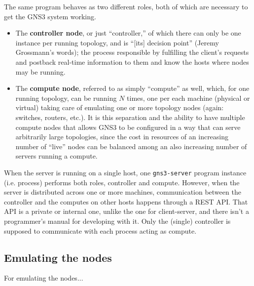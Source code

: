 The same program behaves as two different roles, both of which are necessary to get the GNS3 system working.

\begin{itemize}
	\item The \textbf{controller node}, or just ``controller,'' of which there can only be one instance per running topology, and is ``[its] decision point'' (Jeremy Grossmann's words); the process responsible by fulfilling the client's requests and postback real-time information to them and know the hosts where nodes may be running.
	\item The \textbf{compute node}, referred to as simply ``compute'' as well, which, for one running topology, can be running $N$ times, one per each machine (physical or virtual) taking care of emulating one or more topology nodes (again: switches, routers, etc.).
	It is this separation and the ability to have multiple compute nodes that allows GNS3 to be configured in a way that can serve arbitrarily large topologies, since the cost in resources of an increasing number of ``live'' nodes can be balanced among an also increasing number of servers running a compute.
\end{itemize}

When the server is running on a single host, one \texttt{gns3-server} program instance (i.e. process) performs both roles, controller and compute.
However, when the server is distributed across one or more machines, communication between the controller and the computes on other hosts happens through a REST API.
That API is a private or internal one, unlike the one for client-server, and there isn't a programmer's manual for developing with it.
Only the (single) controller is supposed to communicate with each process acting as compute.

\subsection{Emulating the nodes}
\label{subsec:gns3emulatingthenodes}

For emulating the nodes...


